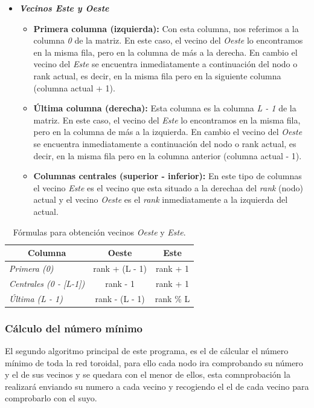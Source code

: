 \documentclass[11pt]{article}
\begin{document}
\begin{itemize}
	\item \textit{\textbf{Vecinos Este y Oeste}}
	\begin{itemize}
		\item \textbf{Primera columna (izquierda):} Con esta columna, nos referimos a la columna \textit{0} de la matriz. En este caso, el vecino del \textit{Oeste} lo encontramos en la misma fila, pero en la columna de más a la derecha. En cambio el vecino del \textit{Este} se encuentra inmediatamente a continuación del nodo o rank actual, es decir, en la misma fila pero en la siguiente columna (columna actual + 1).
		
		\item \textbf{Última columna (derecha):} Esta columna es la columna \textit{L - 1} de la matriz. En este caso, el vecino del \textit{Este}  lo encontramos en la misma fila, pero en la columna de más a la izquierda. En cambio el vecino del \textit{Oeste} se encuentra inmediatamente a continuación del nodo o rank actual, es decir, en la misma fila pero en la  columna anterior (columna actual - 1).
		
		\item \textbf{Columnas centrales (superior - inferior):} En este tipo de columnas el vecino \textit{Este} es el vecino que esta situado a la derechaa del \textit{rank} (nodo) actual y el vecino \textit{Oeste} es el \textit{rank} inmediatamente a la izquierda del actual.
		
	\end{itemize}

\end{itemize}

\begin{table}[H]
\centering
\begin{tabular}{|l|c|c|}
\hline
\multicolumn{1}{|c|}{\textbf{Columna}} & \textbf{Oeste}     & \textbf{Este} \\ \hline
\textit{Primera (0)}                &rank + (L - 1) & rank + 1     \\ \hline
\textit{Centrales (0 - {[}L-1{]})}  & rank - 1           & rank + 1     \\ \hline
\textit{Última (L - 1)}             & rank - (L - 1)          & rank \% L    \\ \hline
\end{tabular}
\caption{Fórmulas para obtención vecinos \textit{Oeste} y \textit{Este}.}
\label{tab:columnas}
\end{table}

\subsubsection{Cálculo del número mínimo}
El segundo algoritmo principal de este programa, es el de cálcular el número mínimo de toda la red toroidal, para ello cada nodo ira comprobando su número y el de sus vecinos y se quedara con el menor de ellos, esta comnprobación la realizará enviando su numero a cada vecino y recogiendo el el de cada vecino para comprobarlo con el suyo.
\end{document}
